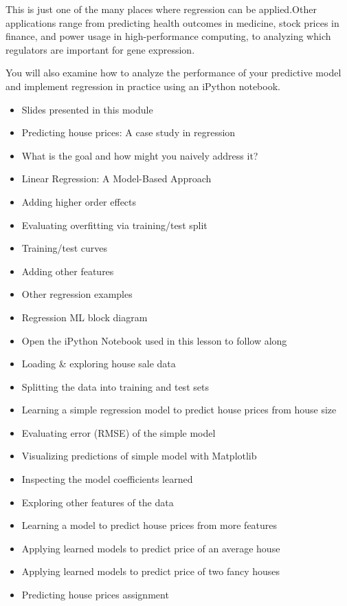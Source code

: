 This is just one of the many places where regression can be applied.Other applications range from predicting health outcomes in medicine, stock prices in finance, and power usage in high-performance computing, to analyzing which regulators are important for gene expression.

You will also examine how to analyze the performance of your predictive model and implement regression in practice using an iPython notebook.
\begin{itemize}
\item Slides presented in this module
\item Predicting house prices: A case study in regression
\item What is the goal and how might you naively address it?
\item Linear Regression: A Model-Based Approach
\item Adding higher order effects
\item Evaluating overfitting via training/test split
\item Training/test curves
\item Adding other features
\item Other regression examples
\item Regression ML block diagram
\item Open the iPython Notebook used in this lesson to follow along
\item Loading & exploring house sale data
\item Splitting the data into training and test sets
\item Learning a simple regression model to predict house prices from house size
\item Evaluating error (RMSE) of the simple model
\item Visualizing predictions of simple model with Matplotlib
\item Inspecting the model coefficients learned
\item Exploring other features of the data
\item Learning a model to predict house prices from more features
\item Applying learned models to predict price of an average house
\item Applying learned models to predict price of two fancy houses
\item Predicting house prices assignment
\end{itemize}
